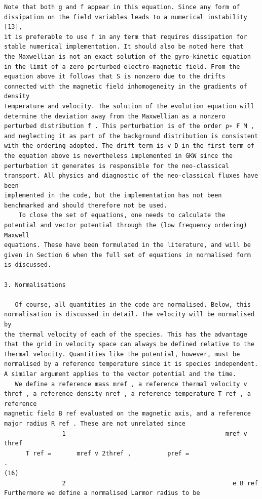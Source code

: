 \documentclass[a4paper]{article}
\newcommand{\gkwpagefont}{\fontsize{6.0pt}{7.55pt}\selectfont}
\begin{document}
\begin{Verbatim}[fontsize=\gkwpagefont]
Note that both g and f appear in this equation. Since any form of dissipation on the field variables leads to a numerical instability [13],
it is preferable to use f in any term that requires dissipation for stable numerical implementation. It should also be noted here that
the Maxwellian is not an exact solution of the gyro-kinetic equation in the limit of a zero perturbed electro-magnetic field. From the
equation above it follows that S is nonzero due to the drifts connected with the magnetic field inhomogeneity in the gradients of density
temperature and velocity. The solution of the evolution equation will determine the deviation away from the Maxwellian as a nonzero
perturbed distribution f . This perturbation is of the order ρ∗ F M , and neglecting it as part of the background distribution is consistent
with the ordering adopted. The drift term is v D in the first term of the equation above is nevertheless implemented in GKW since the
perturbation it generates is responsible for the neo-classical transport. All physics and diagnostic of the neo-classical fluxes have been
implemented in the code, but the implementation has not been benchmarked and should therefore not be used.
    To close the set of equations, one needs to calculate the potential and vector potential through the (low frequency ordering) Maxwell
equations. These have been formulated in the literature, and will be given in Section 6 when the full set of equations in normalised form
is discussed.

3. Normalisations

   Of course, all quantities in the code are normalised. Below, this normalisation is discussed in detail. The velocity will be normalised by
the thermal velocity of each of the species. This has the advantage that the grid in velocity space can always be defined relative to the
thermal velocity. Quantities like the potential, however, must be normalised by a reference temperature since it is species independent.
A similar argument applies to the vector potential and the time.
   We define a reference mass mref , a reference thermal velocity v thref , a reference density nref , a reference temperature T ref , a reference
magnetic field B ref evaluated on the magnetic axis, and a reference major radius R ref . These are not unrelated since
                1                                            mref v thref
      T ref =       mref v 2thref ,          ρref =                         .                                                                            (16)
                2                                              e B ref
Furthermore we define a normalised Larmor radius to be


\end{Verbatim}
\end{document}
